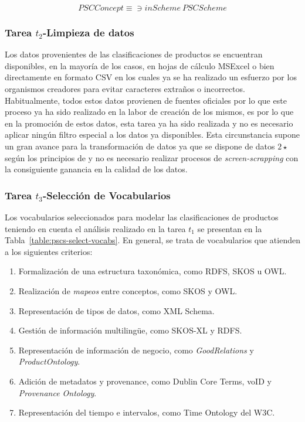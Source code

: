 \begin{equation}
 PSCConcept \equiv\ni inScheme~PSCScheme
\end{equation}

\subsubsection{Tarea $t_2$-Limpieza de datos}
Los datos provenientes de las clasificaciones de productos se encuentran disponibles, en la mayoría de los casos, 
en hojas de cálculo MSExcel o bien directamente en formato \gls{CSV} en los cuales ya se ha realizado un esfuerzo por los organismos 
creadores para evitar caracteres extraños o incorrectos. Habitualmente, todos estos datos provienen de fuentes oficiales por lo que
este proceso ya ha sido realizado en la labor de creación de los mismos, es por lo que en la promoción de estos datos, esta tarea
ya ha sido realizada y no es necesario aplicar ningún filtro especial a los datos ya disponibles. Esta circunstancia supone 
un gran avance para la transformación de datos ya que se dispone de datos $2\star$ según los principios de \linkeddata y no 
es necesario realizar procesos de \textit{screen-scrapping} con la consiguiente ganancia en la calidad de los datos.

\subsubsection{Tarea $t_3$-Selección de Vocabularios}
Los vocabularios seleccionados para modelar las clasificaciones de productos teniendo en cuenta el análisis 
realizado en la tarea $t_1$ se presentan en la Tabla~\ref{table:pscs-select-vocabs}. En general, se trata de vocabularios 
que atienden a los siguientes criterios:

\begin{enumerate}
 \item Formalización de una estructura taxonómica, como RDFS, \gls{SKOS} u \gls{OWL}.
 \item Realización de \textit{mapeos} entre conceptos, como SKOS y OWL.
 \item Representación de tipos de datos, como \gls{XML Schema}.
 \item Gestión de información multiling\"{u}e, como \gls{SKOS-XL} y RDFS.
 \item Representación de información de negocio, como \textit{GoodRelations} y \textit{ProductOntology}.
 \item Adición de metadatos y provenance, como Dublin Core Terms, \gls{voID} y \textit{Provenance Ontology}.
 \item Representación del tiempo e intervalos, como Time Ontology del \gls{W3C}.
\end{enumerate}


